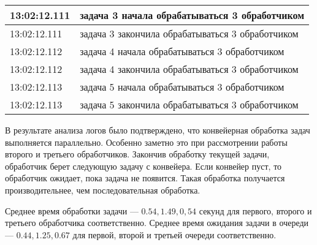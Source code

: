 \begin{table}[h]
\begin{center}
\begin{threeparttable}
\begin{tabular}{|l|l|}
                         13:02:12.111  & задача 3 начала обрабатываться 3 обработчиком\\
                                                 \hline

                         13:02:12.111  & задача 3 закончила обрабатываться 3 обработчиком \\
                                                 \hline

                         13:02:12.112  & задача 4 начала обрабатываться 3 обработчиком \\
                                                 \hline

                         13:02:12.112  & задача 4 закончила обрабатываться 3 обработчиком \\
                                                 \hline

                         13:02:12.113  & задача 5 начала обрабатываться 3 обработчиком \\
                                                 \hline

                         13:02:12.113  & задача 5 закончила обрабатываться 3 обработчиком \\
                                                 \hline


                        \hline
                    \end{tabular}
		\end{threeparttable}
    \end{center}
\end{table}


\clearpage
В результате анализа логов было подтверждено, что конвейерная обработка задач выполняется параллельно. Особенно заметно это при рассмотрении работы второго и третьего обработчиков. Закончив обработку текущей задачи, обработчик берет следующую задачу с конвейера. Если конвейер пуст, то обработчик ожидает, пока задача не появится. Такая обработка получается производительнее, чем последовательная обработка.


Среднее время обработки задачи --- $0.54, 1.49, 0,54$ секунд для первого, второго и третьего обработчика соответственно.
Среднее время ожидания задачи в очереди --- $0.44, 1.25, 0.67$ для первой, второй и третьей очереди соответственно.

\clearpage


